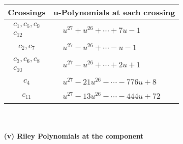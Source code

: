 \documentclass[1p]{elsarticle_modified}
\theoremstyle{definition}
\begin{document}
\begin{tabular}{m{50pt}|m{274pt}}
Crossings & \hspace{64pt}u-Polynomials at each crossing \\
\hline $$\begin{aligned}c_{1},c_{5},c_{9}\\c_{12}\end{aligned}$$&$\begin{aligned}
&u^{27}+u^{26}+\cdots+7 u-1
\end{aligned}$\\
\hline $$\begin{aligned}c_{2},c_{7}\end{aligned}$$&$\begin{aligned}
&u^{27}- u^{26}+\cdots- u-1
\end{aligned}$\\
\hline $$\begin{aligned}c_{3},c_{6},c_{8}\\c_{10}\end{aligned}$$&$\begin{aligned}
&u^{27}- u^{26}+\cdots+2 u+1
\end{aligned}$\\
\hline $$\begin{aligned}c_{4}\end{aligned}$$&$\begin{aligned}
&u^{27}-21 u^{26}+\cdots-776 u+8
\end{aligned}$\\
\hline $$\begin{aligned}c_{11}\end{aligned}$$&$\begin{aligned}
&u^{27}-13 u^{26}+\cdots-444 u+72
\end{aligned}$\\
\hline
\end{tabular}\\~\\
\newpage\renewcommand{\arraystretch}{1}
\flushleft \textbf{(v) Riley Polynomials at the component}\newline \\
\end{document}
